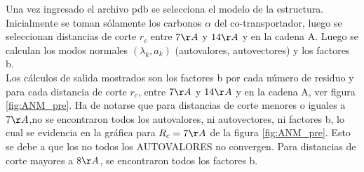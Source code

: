 Una vez ingresado el archivo pdb se selecciona el modelo de la estructura. Inicialmente se toman s\'{o}lamente los carbonos $\alpha$ del co-transportador, luego  se seleccionan distancias de corte $r_c$ entre $7\AA$ y $14\AA$ y en la cadena A. Luego se calculan los modos normales $(\lambda_k,a_k)$ (autovalores, autovectores) y los factores b.\\

Los c\'{a}lculos de salida mostrados son los factores b por cada n\'{u}mero de residuo y para cada distancia de corte $r_c$, entre $7\AA$ y $14\AA$ y en la cadena A, ver figura \ref{fig:ANM_pre}. Ha de notarse que para distancias de corte menores o iguales a $7\AA$,no se encontraron todos  los autovalores, ni autovectores, ni factores b, lo cual se evidencia en la gr\'{a}fica para  $R_c=7\AA$ de la figura \ref{fig:ANM_pre}. Esto se debe a que los no todos los AUTOVALORES no convergen. Para distancias de corte mayores a $8\AA$, se encontraron todos los factores b.\\
